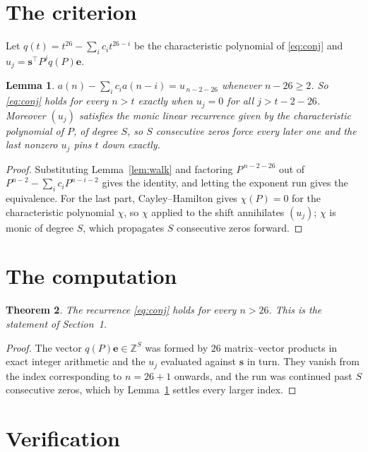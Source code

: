 \documentclass[11pt,a4paper]{article}
\theoremstyle{plain}
\newtheorem{theorem}{Theorem}
\newtheorem{lemma}[theorem]{Lemma}
\theoremstyle{definition}
\begin{document}
\section{The criterion}

Let $q(t)=t^{26}-\sum_i c_i t^{26-i}$ be the characteristic polynomial of
\eqref{eq:conj} and $u_j=\mathbf{s}^{\!\top}P^{j}q(P)\mathbf{e}$.

\begin{lemma}\label{lem:crit}
$a(n)-\sum_i c_i a(n-i)=u_{\,n-2-26}$ whenever $n-26\ge2$. So \eqref{eq:conj}
holds for every $n>t$ exactly when $u_j=0$ for all $j>t-2-26$. Moreover $(u_j)$
satisfies the monic linear recurrence given by the characteristic polynomial of $P$, of
degree $S$, so $S$ consecutive zeros force every later one and the last nonzero $u_j$ pins
$t$ down exactly.
\end{lemma}

\begin{proof}
Substituting Lemma~\ref{lem:walk} and factoring $P^{\,n-2-26}$ out of
$P^{n-2}-\sum_i c_i P^{n-i-2}$ gives the identity, and letting the exponent run gives the
equivalence. For the last part, Cayley--Hamilton gives $\chi(P)=0$ for the characteristic
polynomial $\chi$, so $\chi$ applied to the shift annihilates $(u_j)$; $\chi$ is monic of
degree $S$, which propagates $S$ consecutive zeros forward.
\end{proof}

\section{The computation}

\begin{theorem}
The recurrence \eqref{eq:conj} holds for every $n>26$. This is the statement of
Section~1.
\end{theorem}

\begin{proof}
The vector $q(P)\mathbf{e}\in\mathbb{Z}^{S}$ was formed by $26$ matrix--vector
products in exact integer arithmetic and the $u_j$ evaluated against $\mathbf{s}$ in turn.
They vanish from the index corresponding to $n=26+1$ onwards, and the run was continued
past $S$ consecutive zeros, which by Lemma~\ref{lem:crit} settles every larger index.
\end{proof}

\section{Verification}
\end{document}
